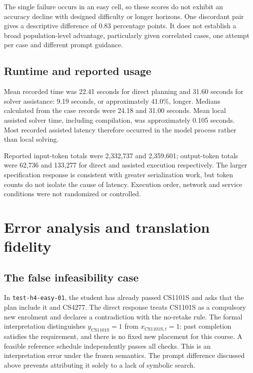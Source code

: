 \documentclass[11pt,a4paper]{article}
\newcommand{\code}[1]{\texttt{#1}}
\begin{document}
The single failure occurs in an easy cell, so these scores do not exhibit an
accuracy decline with designed difficulty or longer horizons. One discordant
pair gives a descriptive difference of 0.83 percentage points. It does not
establish a broad population-level advantage, particularly given correlated
cases, one attempt per case and different prompt guidance.

\subsection{Runtime and reported usage}
Mean recorded time was 22.41 seconds for direct planning and 31.60 seconds
for solver assistance: 9.19 seconds, or approximately 41.0\%, longer.
Medians calculated from the case records were 24.18 and 31.00 seconds.
Mean local assisted solver time, including compilation, was approximately
0.105 seconds. Most recorded assisted latency therefore occurred in the
model process rather than local solving.

Reported input-token totals were 2,332,737 and 2,359,601; output-token totals
were 62,736 and 133,277 for direct and assisted execution respectively.
The larger specification response is consistent with greater serialization
work, but token counts do not isolate the cause of latency. Execution order,
network and service conditions were not randomized or controlled.

\par
\section{Error analysis and translation fidelity}
\subsection{The false infeasibility case}
In \code{test-h4-easy-01}, the student has already passed CS1101S and asks
that the plan include it and CS4277. The direct response treats CS1101S
as a compulsory new enrolment and declares a contradiction with the
no-retake rule. The formal interpretation distinguishes
$y_{\mathrm{CS1101S}}=1$ from $x_{\mathrm{CS1101S},t}=1$: past completion
satisfies the requirement, and there is no fixed new placement for this
course. A feasible reference schedule independently passes all checks.
This is an interpretation error under the frozen semantics. The prompt
difference discussed above prevents attributing it solely to a lack of
symbolic search.
\end{document}
